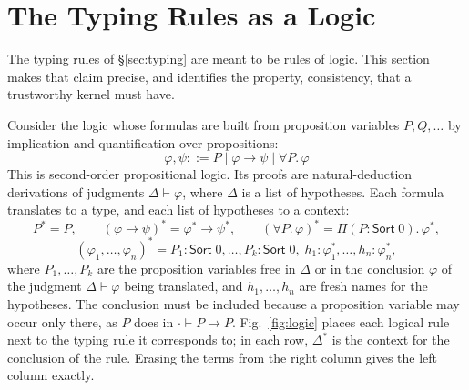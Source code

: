 \documentclass[acmsmall,screen,nonacm]{acmart}
\newcommand{\Sort}[1]{\mathsf{Sort}\;#1}
\newcommand{\tPi}[3]{\Pi(#1{:}#2).\,#3}
\begin{document}
\section{The Typing Rules as a Logic}
\label{sec:logic}

The typing rules of \S\ref{sec:typing} are meant to be rules of logic.
This section makes that claim precise, and identifies the property, consistency, that a trustworthy kernel must have.

Consider the logic whose formulas are built from proposition variables $P, Q, \ldots$ by implication and quantification over propositions:
\[
\varphi, \psi ::= P \mid \varphi \to \psi \mid \forall P.\,\varphi
\]
This is second-order propositional logic.
Its proofs are natural-deduction derivations of judgments $\Delta \vdash \varphi$, where $\Delta$ is a list of hypotheses.
Each formula translates to a type, and each list of hypotheses to a context:
\[
P^\ast = P, \qquad
(\varphi \to \psi)^\ast = \varphi^\ast \to \psi^\ast, \qquad
(\forall P.\,\varphi)^\ast = \tPi{P}{\Sort{0}}{\varphi^\ast},
\]
\[
(\varphi_1, \ldots, \varphi_n)^\ast = P_1 : \Sort{0}, \ldots, P_k : \Sort{0},\; h_1 : \varphi_1^\ast, \ldots, h_n : \varphi_n^\ast,
\]
where $P_1, \ldots, P_k$ are the proposition variables free in $\Delta$ or in the conclusion $\varphi$ of the judgment $\Delta \vdash \varphi$ being translated,
and $h_1, \ldots, h_n$ are fresh names for the hypotheses.
The conclusion must be included because a proposition variable may occur only there, as $P$ does in $\cdot \vdash P \to P$.
Fig.~\ref{fig:logic} places each logical rule next to the typing rule it corresponds to; in each row, $\Delta^\ast$ is the context for the conclusion of the rule.
Erasing the terms from the right column gives the left column exactly.
\end{document}
